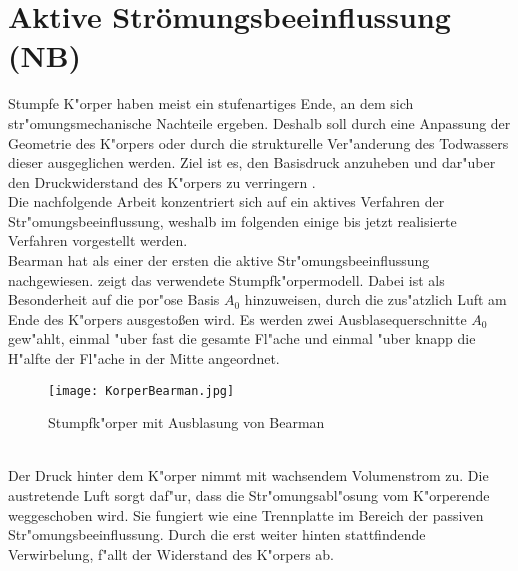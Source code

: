 



\newpage
\section{Aktive Str\"omungsbeeinflussung (NB)}

Stumpfe K"orper haben meist ein stufenartiges Ende, an dem sich str"omungsmechanische Nachteile ergeben. Deshalb soll durch eine Anpassung der Geometrie des K"orpers oder durch die strukturelle Ver"anderung des Todwassers dieser ausgeglichen werden. Ziel ist es, den Basisdruck anzuheben und dar"uber den Druckwiderstand des K"orpers zu verringern \cite{Hucho.2011}.\\
Die nachfolgende Arbeit konzentriert sich auf ein aktives Verfahren der Str"omungsbeeinflussung, weshalb im folgenden einige bis jetzt realisierte Verfahren vorgestellt werden.\\

Bearman \cite{Hucho.2011} hat als einer der ersten die aktive Str"omungsbeeinflussung nachgewiesen.  zeigt das verwendete Stumpfk"orpermodell. Dabei ist als Besonderheit auf die por"ose Basis \(A_{0}\) hinzuweisen, durch die zus"atzlich Luft am Ende des K"orpers ausgesto\ss{}en wird. Es werden zwei Ausblasequerschnitte \(A_{0}\) gew"ahlt, einmal "uber fast die gesamte Fl"ache und einmal "uber knapp die H"alfte der Fl"ache in der Mitte angeordnet.
\begin{figure}[h]
	\centering
	\texttt{[image: KorperBearman.jpg]}
	\caption{Stumpfk"orper mit Ausblasung von Bearman \cite{Hucho.2011}}
	\label{fig:Bearman}
\end{figure}\\
Der Druck hinter dem K"orper nimmt mit wachsendem Volumenstrom zu. Die austretende Luft sorgt daf"ur, dass die Str"omungsabl"osung vom K"orperende weggeschoben wird. Sie fungiert wie eine Trennplatte im Bereich der passiven Str"omungsbeeinflussung. Durch die erst weiter hinten stattfindende Verwirbelung, f"allt der Widerstand des K"orpers ab.

